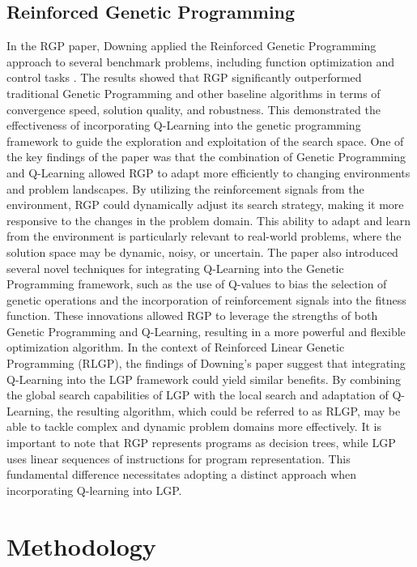 \documentclass[12pt, final]{dalcsthesis}
\begin{document}
\section{Reinforced Genetic Programming}
In the RGP paper, Downing applied the Reinforced Genetic Programming approach to several benchmark problems, including function optimization and control tasks \cite{downing1995reinforced}. The results showed that RGP significantly outperformed traditional Genetic Programming and other baseline algorithms in terms of convergence speed, solution quality, and robustness. This demonstrated the effectiveness of incorporating Q-Learning into the genetic programming framework to guide the exploration and exploitation of the search space.
One of the key findings of the paper was that the combination of Genetic Programming and Q-Learning allowed RGP to adapt more efficiently to changing environments and problem landscapes. By utilizing the reinforcement signals from the environment, RGP could dynamically adjust its search strategy, making it more responsive to the changes in the problem domain. This ability to adapt and learn from the environment is particularly relevant to real-world problems, where the solution space may be dynamic, noisy, or uncertain.
The paper also introduced several novel techniques for integrating Q-Learning into the Genetic Programming framework, such as the use of Q-values to bias the selection of genetic operations and the incorporation of reinforcement signals into the fitness function. These innovations allowed RGP to leverage the strengths of both Genetic Programming and Q-Learning, resulting in a more powerful and flexible optimization algorithm.
In the context of Reinforced Linear Genetic Programming (RLGP), the findings of Downing's paper suggest that integrating Q-Learning into the LGP framework could yield similar benefits. By combining the global search capabilities of LGP with the local search and adaptation of Q-Learning, the resulting algorithm, which could be referred to as RLGP, may be able to tackle complex and dynamic problem domains more effectively.
It is important to note that RGP represents programs as decision trees, while LGP uses linear sequences of instructions for program representation. This fundamental difference necessitates adopting a distinct approach when incorporating Q-learning into LGP.
\chapter{Methodology}
\end{document}
